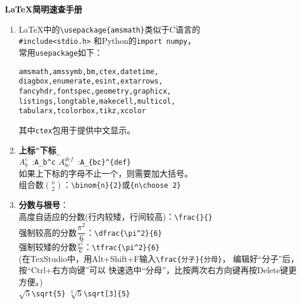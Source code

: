 \documentclass{article}
\newcommand{\q}{\quad}
\begin{document}
\begin{center}
{\Large \textbf{\LaTeX 简明速查手册} }
\end{center}  


\begin{multicols}{2}     
\begin{enumerate}

\item \LaTeX 中的\verb|\usepackage{amsmath}|类似于C语言的\\ \verb|#include<stdio.h>|
和Python的\verb|import numpy|，\\ 常用\verb|usepackage|如下：
\begin{lstlisting}
amsmath,amssymb,bm,ctex,datetime, 
diagbox,enumerate,esint,extarrows,
fancyhdr,fontspec,geometry,graphicx,
listings,longtable,makecell,multicol,
tabularx,tcolorbox,tikz,xcolor  
\end{lstlisting} 
其中\verb|ctex|包用于提供中文显示。

\item \textbf{上标}\q \verb|^|\quad \textbf{下标}\q \verb|_| \\
$ A_b^c $\ :\q \verb|A_b^c| \q\q\q\q 
$ A_{bc}^{def} $\ :\q \verb|A_{bc}^{def}| \\
如果上下标的字母不止一个，则需要加大括号。\\
组合数$ \binom{n}{2} $：\verb|\binom{n}{2}|或\verb|{n\choose 2}|

\item \textbf{分数与根号}：\\
高度自适应的分数(行内较矮，行间较高)：\verb|\frac{}{}|\\
强制较高的分数$ \dfrac{\pi^2}{6} $：\verb|\dfrac{\pi^2}{6}| \\
强制较矮的分数$ \tfrac{\pi^2}{6} $：\verb|\tfrac{\pi^2}{6}| \\
(在TexStudio中，用Alt+Shift+F输入\verb|\frac{分子}{分母}|，
编辑好“分子”后，按“Ctrl+右方向键”可以
快速选中“分母”，比按两次右方向键再按Delete键更方便。)\\
$ \sqrt{5} $\q \verb|\sqrt{5}| \q\q\q\q 
$ \sqrt[3]{5} $\q \verb|\sqrt[3]{5}| 


\end{enumerate}
\end{multicols}
\end{document}
